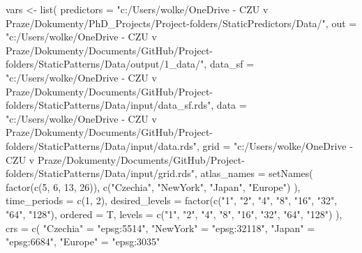 \documentclass[
  letterpaper,
  DIV=11,
  numbers=noendperiod]{scrreprt}
\newenvironment{Shaded}{\begin{snugshade}}{\end{snugshade}}
\newcommand{\AttributeTok}[1]{\textcolor[rgb]{0.40,0.45,0.13}{#1}}
\newcommand{\DecValTok}[1]{\textcolor[rgb]{0.68,0.00,0.00}{#1}}
\newcommand{\FunctionTok}[1]{\textcolor[rgb]{0.28,0.35,0.67}{#1}}
\newcommand{\NormalTok}[1]{\textcolor[rgb]{0.00,0.23,0.31}{#1}}
\newcommand{\OtherTok}[1]{\textcolor[rgb]{0.00,0.23,0.31}{#1}}
\newcommand{\StringTok}[1]{\textcolor[rgb]{0.13,0.47,0.30}{#1}}
\begin{document}
\begin{Shaded}
\begin{Highlighting}[]
\NormalTok{vars }\OtherTok{\textless{}{-}} \FunctionTok{list}\NormalTok{(}
  \AttributeTok{predictors =}
    \StringTok{"c:/Users/wolke/OneDrive {-} CZU v Praze/Dokumenty/PhD\_Projects/Project{-}folders/StaticPredictors/Data/"}\NormalTok{,}
  \AttributeTok{out =}
    \StringTok{"c:/Users/wolke/OneDrive {-} CZU v Praze/Dokumenty/Documents/GitHub/Project{-}folders/StaticPatterns/Data/output/1\_data/"}\NormalTok{,}
  \AttributeTok{data\_sf =}
    \StringTok{"c:/Users/wolke/OneDrive {-} CZU v Praze/Dokumenty/Documents/GitHub/Project{-}folders/StaticPatterns/Data/input/data\_sf.rds"}\NormalTok{,}
  \AttributeTok{data =}
    \StringTok{"c:/Users/wolke/OneDrive {-} CZU v Praze/Dokumenty/Documents/GitHub/Project{-}folders/StaticPatterns/Data/input/data.rds"}\NormalTok{,}
  \AttributeTok{grid =}
    \StringTok{"c:/Users/wolke/OneDrive {-} CZU v Praze/Dokumenty/Documents/GitHub/Project{-}folders/StaticPatterns/Data/input/grid.rds"}\NormalTok{,}
  \AttributeTok{atlas\_names =} \FunctionTok{setNames}\NormalTok{(}
    \FunctionTok{factor}\NormalTok{(}\FunctionTok{c}\NormalTok{(}\DecValTok{5}\NormalTok{, }\DecValTok{6}\NormalTok{, }\DecValTok{13}\NormalTok{, }\DecValTok{26}\NormalTok{)),}
    \FunctionTok{c}\NormalTok{(}\StringTok{"Czechia"}\NormalTok{, }\StringTok{"NewYork"}\NormalTok{, }\StringTok{"Japan"}\NormalTok{, }\StringTok{"Europe"}\NormalTok{)}
\NormalTok{  ),}
  \AttributeTok{time\_periods =} \FunctionTok{c}\NormalTok{(}\DecValTok{1}\NormalTok{, }\DecValTok{2}\NormalTok{),}
  \AttributeTok{desired\_levels =} \FunctionTok{factor}\NormalTok{(}\FunctionTok{c}\NormalTok{(}\StringTok{"1"}\NormalTok{, }\StringTok{"2"}\NormalTok{, }\StringTok{"4"}\NormalTok{, }\StringTok{"8"}\NormalTok{, }\StringTok{"16"}\NormalTok{, }\StringTok{"32"}\NormalTok{, }\StringTok{"64"}\NormalTok{, }\StringTok{"128"}\NormalTok{),}
    \AttributeTok{ordered =}\NormalTok{ T,}
    \AttributeTok{levels =} \FunctionTok{c}\NormalTok{(}\StringTok{"1"}\NormalTok{, }\StringTok{"2"}\NormalTok{, }\StringTok{"4"}\NormalTok{, }\StringTok{"8"}\NormalTok{, }\StringTok{"16"}\NormalTok{, }\StringTok{"32"}\NormalTok{, }\StringTok{"64"}\NormalTok{, }\StringTok{"128"}\NormalTok{)}
\NormalTok{  ),}
  \AttributeTok{crs =} \FunctionTok{c}\NormalTok{(}
    \StringTok{"Czechia"} \OtherTok{=} \StringTok{"epsg:5514"}\NormalTok{,}
    \StringTok{"NewYork"} \OtherTok{=} \StringTok{"epsg:32118"}\NormalTok{,}
    \StringTok{"Japan"} \OtherTok{=} \StringTok{"epsg:6684"}\NormalTok{,}
    \StringTok{"Europe"} \OtherTok{=} \StringTok{"epsg:3035"}

\end{Highlighting}
\end{Shaded}
\end{document}

